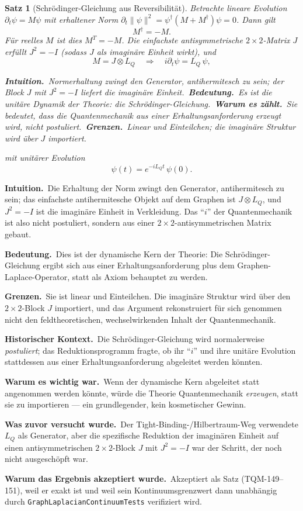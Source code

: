 \documentclass[10pt,twoside,openany]{book}
\newtheorem{theorem}{Satz}[chapter]
\newcommand{\theoremnotes}[3]{%
  \par\medskip\noindent
  \textbf{Intuition.}\ #1\par
  \textbf{Bedeutung.}\ #2\par
  \textbf{Grenzen.}\ #3\par}
\newcommand{\eqnotes}[4]{%
  \par\smallskip\noindent
  \textbf{Intuition.}\ #1\ 
  \textbf{Bedeutung.}\ #2\ 
  \textbf{Warum es zählt.}\ #3\ 
  \textbf{Grenzen.}\ #4\par}
\newcommand{\historynotes}[4]{%
  \par\smallskip\noindent
  \textbf{Historischer Kontext.}\ #1\par
  \textbf{Warum es wichtig war.}\ #2\par
  \textbf{Was zuvor versucht wurde.}\ #3\par
  \textbf{Warum das Ergebnis akzeptiert wurde.}\ #4\par}
\begin{document}
\begin{theorem}[Schr\"odinger-Gleichung aus Reversibilität]
Betrachte lineare Evolution $\partial_t\psi = M\psi$ mit erhaltener Norm
$\partial_t\|\psi\|^2 = \psi^\dagger(M+M^\dagger)\psi = 0$. Dann gilt
\begin{equation}
M^\dagger = -M .
\end{equation}
Für reelles $M$ ist dies $M^T=-M$. Die einfachste antisymmetrische $2\times2$-Matrix $J$
erfüllt $J^2=-I$ (sodass $J$ als imaginäre Einheit wirkt), und
\begin{equation}
M = J\otimes L_Q \quad\Longrightarrow\quad i\partial_t \psi = L_Q\,\psi,
\end{equation}

\eqnotes
{Normerhaltung zwingt den Generator, antihermitesch zu sein; der Block $J$ mit $J^2=-I$
liefert die imaginäre Einheit.}
{Es ist die unitäre Dynamik der Theorie: die Schr\"odinger-Gleichung.}
{Sie bedeutet, dass die Quantenmechanik aus einer Erhaltungsanforderung \emph{erzeugt}
wird, nicht postuliert.}
{Linear und Einteilchen; die imaginäre Struktur wird über $J$ importiert.}
mit unitärer Evolution
\begin{equation}
\psi(t) = e^{-iL_Qt}\,\psi(0).
\end{equation}
\end{theorem}

\theoremnotes
{Die Erhaltung der Norm zwingt den Generator, antihermitesch zu sein; das einfachste
antihermitesche Objekt auf dem Graphen ist $J\otimes L_Q$, und $J^2=-I$ ist die imaginäre
Einheit in Verkleidung. Das ``$i$'' der Quantenmechanik ist also nicht postuliert,
sondern aus einer $2\times2$-antisymmetrischen Matrix gebaut.}
{Dies ist der dynamische Kern der Theorie: Die Schr\"odinger-Gleichung ergibt sich aus
einer Erhaltungsanforderung plus dem Graphen-Laplace-Operator, statt als Axiom behauptet
zu werden.}
{Sie ist linear und Einteilchen. Die imaginäre Struktur wird über den $2\times2$-Block $J$
importiert, und das Argument rekonstruiert für sich genommen nicht den feldtheoretischen,
wechselwirkenden Inhalt der Quantenmechanik.}

\historynotes
{Die Schr\"odinger-Gleichung wird normalerweise \emph{postuliert}; das
Reduktionsprogramm fragte, ob ihr ``$i$'' und ihre unitäre Evolution stattdessen aus
einer Erhaltungsanforderung abgeleitet werden könnten.}
{Wenn der dynamische Kern abgeleitet statt angenommen werden könnte, würde die Theorie
Quantenmechanik \emph{erzeugen}, statt sie zu importieren --- ein grundlegender, kein
kosmetischer Gewinn.}
{Der Tight-Binding-/Hilbertraum-Weg verwendete $L_Q$ als Generator, aber die spezifische
Reduktion der imaginären Einheit auf einen antisymmetrischen $2\times2$-Block $J$ mit
$J^2=-I$ war der Schritt, der noch nicht ausgeschöpft war.}
{Akzeptiert als Satz (TQM-149--151), weil er exakt ist und weil sein Kontinuumsgrenzwert
dann unabhängig durch \texttt{GraphLaplacianContinuumTests} verifiziert wird.}
\end{document}
